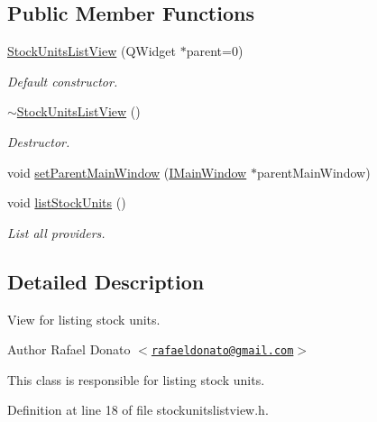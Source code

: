 \subsection*{\-Public \-Member \-Functions}
\begin{DoxyCompactItemize}
\item 
\hyperlink{class_stock_units_list_view_abca43c1937331efa121f0177a6547deb}{\-Stock\-Units\-List\-View} (\-Q\-Widget $\ast$parent=0)
\begin{DoxyCompactList}\small\item\em \-Default constructor. \end{DoxyCompactList}\item 
\hyperlink{class_stock_units_list_view_abb8cd37c88ec8521b62f9ea96668da28}{$\sim$\-Stock\-Units\-List\-View} ()
\begin{DoxyCompactList}\small\item\em \-Destructor. \end{DoxyCompactList}\item 
void \hyperlink{class_stock_units_list_view_a626f916b318a555f14bea85db50a7942}{set\-Parent\-Main\-Window} (\hyperlink{class_i_main_window}{\-I\-Main\-Window} $\ast$parent\-Main\-Window)
\item 
void \hyperlink{class_stock_units_list_view_a26a4b6bf03af4254e5887a6ab7138052}{list\-Stock\-Units} ()
\begin{DoxyCompactList}\small\item\em \-List all providers. \end{DoxyCompactList}\end{DoxyCompactItemize}


\subsection{\-Detailed \-Description}
\-View for listing stock units. 

\begin{DoxyAuthor}{\-Author}
\-Rafael \-Donato $<$\href{mailto:rafaeldonato@gmail.com}{\tt rafaeldonato@gmail.\-com}$>$
\end{DoxyAuthor}
\-This class is responsible for listing stock units. 

\-Definition at line 18 of file stockunitslistview.\-h.



